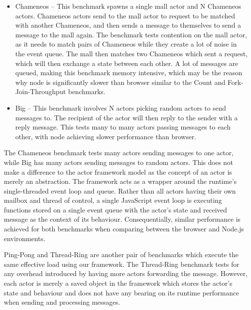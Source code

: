\documentclass[oneside]{um-fict}
\begin{document}
\begin{itemize}
    \item Chameneos – This benchmark spawns a single mall actor and N Chameneos actors. Chameneos actors send to the mall actor to request to be matched with another Chameneos, and then sends a message to themselves to send a message to the mall again. The benchmark tests contention on the mall actor, as it needs to match pairs of Chameneos while they create a lot of noise in the event queue. The mall then matches two Chameneos which sent a request, which will then exchange a state between each other. A lot of messages are queued, making this benchmark memory intensive, which may be the reason why node is significantly slower than browser similar to the Count and Fork-Join-Throughput benchmarks.
    \item Big – This benchmark involves N actors picking random actors to send messages to. The recipient of the actor will then reply to the sender with a reply message. This tests many to many actors passing messages to each other, with node achieving slower performance than browser.
\end{itemize}
The Chameneos benchmark tests many actors sending messages to one actor, while Big has many actors sending messages to random actors. This does not make a difference to the actor framework model as the concept of an actor is merely an abstraction. The framework acts as a wrapper around the runtime's single-threaded event loop and queue. Rather than all actors having their own mailbox and thread of control, a single JavaScript event loop is executing functions stored on a single event queue with the actor's state and received message as the context of its behaviour. Consequentially, similar performance is achieved for both benchmarks when comparing between the browser and Node.js environments.

Ping-Pong and Thread-Ring are another pair of benchmarks which execute the same effective load using our framework. The Thread-Ring benchmark tests for any overhead introduced by having more actors forwarding the message. However, each actor is merely a saved object in the framework which stores the actor's state and behaviour and does not have any bearing on its runtime performance when sending and processing messages.
\end{document}
